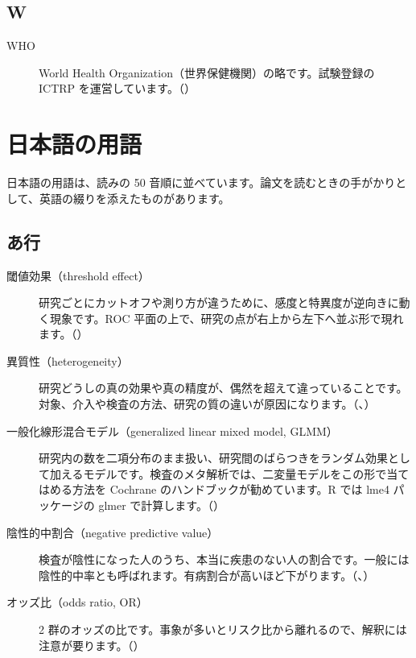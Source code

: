 \subsection*{W}
\begin{description}
\item[WHO] World Health Organization（世界保健機関）の略です。試験登録の ICTRP を運営しています。（）
\end{description}

\section{日本語の用語}
\label{sec:B-2}

日本語の用語は、読みの 50 音順に並べています。論文を読むときの手がかりとして、英語の綴りを添えたものがあります。

\subsection*{あ行}
\begin{description}
\item[閾値効果（threshold effect）] 研究ごとにカットオフや測り方が違うために、感度と特異度が逆向きに動く現象です。ROC 平面の上で、研究の点が右上から左下へ並ぶ形で現れます。（）
\item[異質性（heterogeneity）] 研究どうしの真の効果や真の精度が、偶然を超えて違っていることです。対象、介入や検査の方法、研究の質の違いが原因になります。（、）
\item[一般化線形混合モデル（generalized linear mixed model, GLMM）] 研究内の数を二項分布のまま扱い、研究間のばらつきをランダム効果として加えるモデルです。検査のメタ解析では、二変量モデルをこの形で当てはめる方法を Cochrane のハンドブックが勧めています。R では lme4 パッケージの glmer で計算します。（）
\item[陰性的中割合（negative predictive value）] 検査が陰性になった人のうち、本当に疾患のない人の割合です。一般には陰性的中率とも呼ばれます。有病割合が高いほど下がります。（、）
\item[オッズ比（odds ratio, OR）] 2 群のオッズの比です。事象が多いとリスク比から離れるので、解釈には注意が要ります。（）
\end{description}

